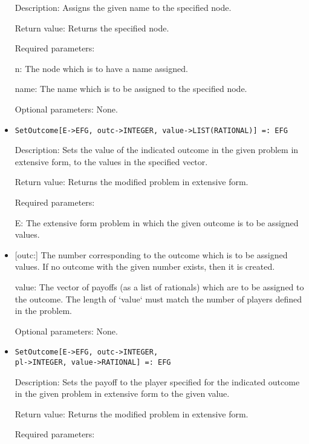 \begin{itemize}
\bd
\item
[Description:] Assigns the given name to the specified node.
\item
[Return value:] Returns the specified node.
\item
[Required parameters:]\hfil\null
	
\bd
\item
[n:] The node which is to have a name assigned.
\item
[name:] The name which is to be assigned to the specified node.
\ed

\item
[Optional parameters:] None.
\ed

\item
\protect \large \begin{verbatim}
SetOutcome[E->EFG, outc->INTEGER, value->LIST(RATIONAL)] =: EFG
\end{verbatim}\normalsize
   
\bd
\item
[Description:] Sets the value of the indicated outcome in the given
problem in extensive form, to the values in the specified vector.
\item
[Return value:] Returns the modified problem in extensive form.
\item
[Required parameters:]\hfil\null
	
\bd
\item
[E:] The extensive form problem in which the given outcome is to be
assigned values.
\item

[outc:] The number corresponding to the outcome which is to be
assigned values.  If no outcome with the given number exists, then it
is created.
\item
[value:] The vector of payoffs (as a list of rationals) which are to
be assigned to the outcome.  The length of `value` must match the
number of players defined in the problem.
\ed

\item
[Optional parameters:] None.
\ed

\item

\protect \large \begin{verbatim} 
SetOutcome[E->EFG, outc->INTEGER,
pl->INTEGER, value->RATIONAL] =: EFG
\end{verbatim}\normalsize

\bd
\item
[Description:] Sets the payoff to the player specified for the
indicated outcome in the given problem in extensive form to the given
value.
\item
[Return value:] Returns the modified problem in extensive form.
\item
[Required parameters:]\hfil\null
	

\end{itemize}
